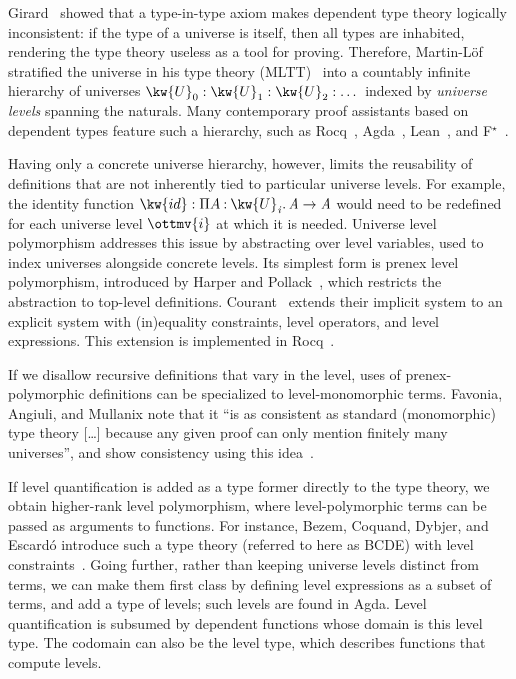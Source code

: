 \documentclass[a4paper,UKenglish,cleveref,autoref,thm-restate]{lipics-v2021}
\newcommand{\citep}[1]{\cite{#1}}
\begin{document}
Girard~\citep{systemf} showed that a type-in-type axiom makes dependent type theory logically inconsistent:
if the type of a universe is itself, then all types are inhabited,
rendering the type theory useless as a tool for proving.
Therefore, Martin-L\"of stratified the universe in his type theory (MLTT)~\citep{mltt}
into a countably infinite hierarchy of universes
$ \kw{U}_{  0  }  :  \kw{U}_{  1  }  :  \kw{U}_{  2  }  : \dots$
indexed by \emph{universe levels} spanning the naturals.
Many contemporary proof assistants based on dependent types feature such a hierarchy,
such as Rocq~\citep{rocq}, Agda~\citep{agda}, Lean~\citep{lean}, and F$^\star$~\citep{fstar}.

Having only a concrete universe hierarchy, however,
limits the reusability of definitions that are not inherently tied to particular universe levels.
For example, the identity function $\kw{id} :   \Pi  A  \mathbin{:}   \kw{U}_{  \mathit{ i }  }   \mathpunct{.}   \mathit{ A }    \to   \mathit{ A }  $
would need to be redefined for each universe level $\ottmv{i}$ at which it is needed.
Universe level polymorphism addresses this issue by abstracting over level variables,
used to index universes alongside concrete levels.
Its simplest form is prenex level polymorphism,
introduced by Harper and Pollack~\citep{anon-univ},
which restricts the abstraction to top-level definitions.
Courant~\citep{explicit} extends their implicit system to an explicit system
with (in)equality constraints, level operators, and level expressions.
This extension is implemented in Rocq~\citep{univ-poly-coq}.

If we disallow recursive definitions that vary in the level,
uses of prenex-polymorphic definitions
can be specialized to level-monomorphic terms.
Favonia, Angiuli, and Mullanix note that it
``is as consistent as standard (monomorphic) type theory [\dots]
because any given proof can only mention finitely many universes'',
and show consistency using this idea~\citep{displacement}.

If level quantification is added as a type former directly to the type theory,
we obtain higher-rank level polymorphism,
where level-polymorphic terms can be passed as arguments to functions.
For instance, Bezem, Coquand, Dybjer, and Escard\'o
introduce such a type theory (referred to here as BCDE)
with level constraints~\citep{univ-poly}.
Going further, rather than keeping universe levels distinct from terms,
we can make them first class by defining level expressions as a subset of terms,
and add a type of levels;
such levels are found in Agda.
Level quantification is subsumed by dependent functions whose domain is this level type.
The codomain can also be the level type,
which describes functions that compute levels.
\end{document}
